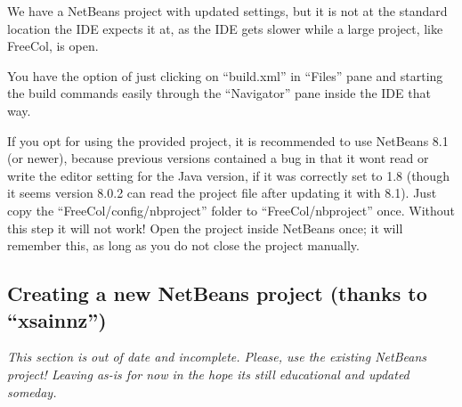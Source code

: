 \documentclass[12pt]{book}
\begin{document}
We have a NetBeans project with updated settings, but it is not at the
standard location the IDE expects it at, as the IDE gets slower while a
large project, like FreeCol, is open.

You have the option of just clicking on ``build.xml'' in ``Files'' pane and
starting the build commands easily through the ``Navigator'' pane inside
the IDE that way.

If you opt for using the provided project, it is recommended to use NetBeans 8.1
(or newer), because previous versions contained a bug in that it wont read or
write the editor setting for the Java version, if it was correctly set to 1.8
(though it seems version 8.0.2 can read the project file after updating it with 8.1).
Just copy the ``FreeCol/config/nbproject'' folder to ``FreeCol/nbproject'' once.
Without this step it will not work!
Open the project inside NetBeans once; it will remember this, as long as
you do not close the project manually.

\hypertarget{Creating a new NetBeans project}{\subsection{Creating a new NetBeans project (thanks to ``xsainnz'')}}

\emph{This section is out of date and incomplete.
Please, use the existing NetBeans project!
Leaving as-is for now in the hope its still educational and updated someday.}
\end{document}
